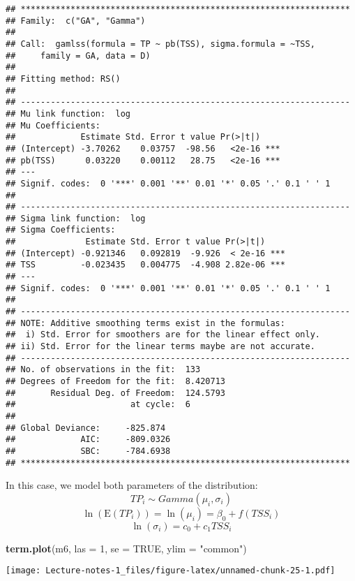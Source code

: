 \documentclass[
]{book}
\newenvironment{Shaded}{\begin{snugshade}}{\end{snugshade}}
\newcommand{\DataTypeTok}[1]{\textcolor[rgb]{0.13,0.29,0.53}{#1}}
\newcommand{\DecValTok}[1]{\textcolor[rgb]{0.00,0.00,0.81}{#1}}
\newcommand{\KeywordTok}[1]{\textcolor[rgb]{0.13,0.29,0.53}{\textbf{#1}}}
\newcommand{\NormalTok}[1]{#1}
\newcommand{\OtherTok}[1]{\textcolor[rgb]{0.56,0.35,0.01}{#1}}
\newcommand{\StringTok}[1]{\textcolor[rgb]{0.31,0.60,0.02}{#1}}
\begin{document}
\begin{verbatim}
## ******************************************************************
## Family:  c("GA", "Gamma") 
## 
## Call:  gamlss(formula = TP ~ pb(TSS), sigma.formula = ~TSS,  
##     family = GA, data = D) 
## 
## Fitting method: RS() 
## 
## ------------------------------------------------------------------
## Mu link function:  log
## Mu Coefficients:
##             Estimate Std. Error t value Pr(>|t|)    
## (Intercept) -3.70262    0.03757  -98.56   <2e-16 ***
## pb(TSS)      0.03220    0.00112   28.75   <2e-16 ***
## ---
## Signif. codes:  0 '***' 0.001 '**' 0.01 '*' 0.05 '.' 0.1 ' ' 1
## 
## ------------------------------------------------------------------
## Sigma link function:  log
## Sigma Coefficients:
##              Estimate Std. Error t value Pr(>|t|)    
## (Intercept) -0.921346   0.092819  -9.926  < 2e-16 ***
## TSS         -0.023435   0.004775  -4.908 2.82e-06 ***
## ---
## Signif. codes:  0 '***' 0.001 '**' 0.01 '*' 0.05 '.' 0.1 ' ' 1
## 
## ------------------------------------------------------------------
## NOTE: Additive smoothing terms exist in the formulas: 
##  i) Std. Error for smoothers are for the linear effect only. 
## ii) Std. Error for the linear terms maybe are not accurate. 
## ------------------------------------------------------------------
## No. of observations in the fit:  133 
## Degrees of Freedom for the fit:  8.420713
##       Residual Deg. of Freedom:  124.5793 
##                       at cycle:  6 
##  
## Global Deviance:     -825.874 
##             AIC:     -809.0326 
##             SBC:     -784.6938 
## ******************************************************************
\end{verbatim}

In this case, we model both parameters of the distribution:
\[TP_i \sim Gamma(\mu_i, \sigma_i)\]
\[\ln(\text{E}(TP_i)) = \ln(\mu_i) =  \beta_0 + f(TSS_i)\]
\[\ln(\sigma_i) = c_0 + c_1TSS_i\]

\begin{Shaded}
\begin{Highlighting}[]
\KeywordTok{term.plot}\NormalTok{(m6, }\DataTypeTok{las =} \DecValTok{1}\NormalTok{, }\DataTypeTok{se =} \OtherTok{TRUE}\NormalTok{, }\DataTypeTok{ylim =} \StringTok{"common"}\NormalTok{)}
\end{Highlighting}
\end{Shaded}

\texttt{[image: Lecture-notes-1\_files/figure-latex/unnamed-chunk-25-1.pdf]}
\end{document}
